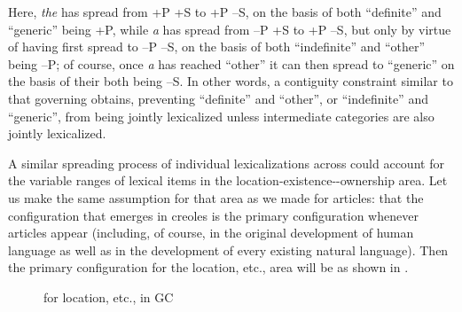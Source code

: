 \noindent Here, \textit{the} has spread from +P +S to +P --S, on the basis of both ``defi\-nite'' and ``generic'' being +P, while \textit{a} has spread from --P +S to +P --S, but only by virtue of having first spread to --P --S, on the basis of both ``indefinite'' and ``other'' being --P; of course, once \textit{a} has reached ``other'' it can then spread to ``generic'' on the basis of their both being --S. In other words, a contiguity constraint similar to that governing  obtains, preventing ``definite'' and ``other'', or ``indefinite'' and ``generic'', from being jointly lexicalized unless intermediate categories are also jointly lexicalized.

A similar spreading process of individual lexicalizations across  could account for the variable ranges of lexical items
in the location-existence--ownership area. Let us make the same assumption for that area as we made for articles: that the configuration that emerges in creoles is the primary configuration whenever articles appear (including, of course, in the original development of human language as well as in the development of every existing natural language). Then the primary configuration for the location, etc., area will be as shown in . %

\begin{figure}[h]
	\begin{center}
	\end{center}
	\caption{ for location, etc., in GC}\label{fig:4.5}
\end{figure}

